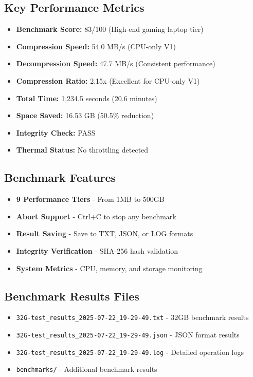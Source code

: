 \documentclass[11pt,a4paper]{article}
\begin{document}
	\subsection{Key Performance Metrics}
	\begin{itemize}
		\item \textbf{Benchmark Score:} 83/100 (High-end gaming laptop tier)
		\item \textbf{Compression Speed:} 54.0 MB/s (CPU-only V1)
		\item \textbf{Decompression Speed:} 47.7 MB/s (Consistent performance)
		\item \textbf{Compression Ratio:} 2.15x (Excellent for CPU-only V1)
		\item \textbf{Total Time:} 1,234.5 seconds (20.6 minutes)
		\item \textbf{Space Saved:} 16.53 GB (50.5\% reduction)
		\item \textbf{Integrity Check:} PASS
		\item \textbf{Thermal Status:} No throttling detected
	\end{itemize}

	\subsection{Benchmark Features}
	\begin{itemize}
		\item \textbf{9 Performance Tiers} - From 1MB to 500GB
		\item \textbf{Abort Support} - Ctrl+C to stop any benchmark
		\item \textbf{Result Saving} - Save to TXT, JSON, or LOG formats
		\item \textbf{Integrity Verification} - SHA-256 hash validation
		\item \textbf{System Metrics} - CPU, memory, and storage monitoring
	\end{itemize}

	\subsection{Benchmark Results Files}
	\begin{itemize}
		\item \texttt{32G-test\_results\_2025-07-22\_19-29-49.txt} - 32GB benchmark results
		\item \texttt{32G-test\_results\_2025-07-22\_19-29-49.json} - JSON format results
		\item \texttt{32G-test\_results\_2025-07-22\_19-29-49.log} - Detailed operation logs
		\item \texttt{benchmarks/} - Additional benchmark results
	\end{itemize}
\end{document}
